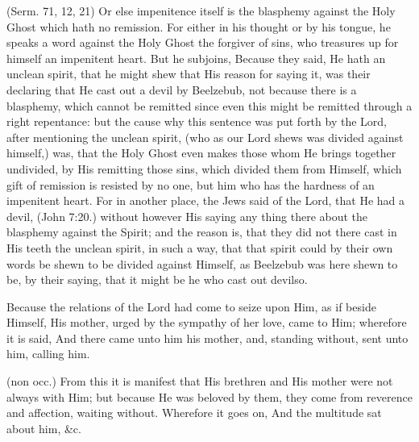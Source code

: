  (Serm. 71, 12, 21) Or else impenitence itself is the blasphemy against the Holy Ghost which hath no remission. For either in his thought or by his tongue, he speaks a word against the Holy Ghost the forgiver of sins, who treasures up for himself an impenitent heart. But he subjoins, Because they said, He hath an unclean spirit, that he might shew that His reason for saying it, was their declaring that He cast out a devil by Beelzebub, not because there is a blasphemy, which cannot be remitted since even this might be remitted through a right repentance: but the cause why this sentence was put forth by the Lord, after mentioning the unclean spirit, (who as our Lord shews was divided against himself,) was, that the Holy Ghost even makes those whom He brings together undivided, by His remitting those sins, which divided them from Himself, which gift of remission is resisted by no one, but him who has the hardness of an impenitent heart. For in another place, the Jews said of the Lord, that He had a devil, (John 7:20.) without however His saying any thing there about the blasphemy against the Spirit; and the reason is, that they did not there cast in His teeth the unclean spirit, in such a way, that that spirit could by their own words be shewn to be divided against Himself, as Beelzebub was here shewn to be, by their saying, that it might be he who cast out devilso.

 

 Because the relations of the Lord had come to seize upon Him, as if beside Himself, His mother, urged by the sympathy of her love, came to Him; wherefore it is said, And there came unto him his mother, and, standing without, sent unto him, calling him.

 (non occ.) From this it is manifest that His brethren and His mother were not always with Him; but because He was beloved by them, they come from reverence and affection, waiting without. Wherefore it goes on, And the multitude sat about him, \&c.

